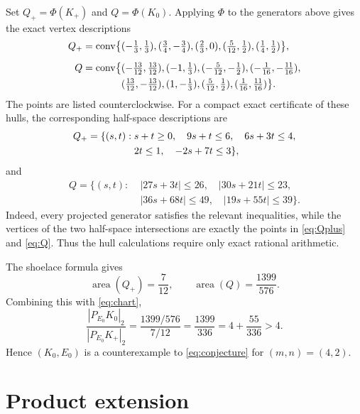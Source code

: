 \documentclass[11pt]{amsart}
\theoremstyle{remark}
\newcommand{\conv}{\operatorname{conv}}
\newcommand{\area}{\operatorname{area}}
\begin{document}
Set $Q_+=\Phi(K_+)$ and $Q=\Phi(K_0)$. Applying $\Phi$ to the generators above
gives the exact vertex descriptions
\begin{align}
Q_+=\conv\bigl\{&
(-\tfrac13,\tfrac13),
(\tfrac34,-\tfrac34),
(\tfrac23,0),
(\tfrac5{12},\tfrac12),
(\tfrac14,\tfrac12)
\bigr\},\label{eq:Qplus}\\[2mm]
Q=\conv\bigl\{&
(-\tfrac{13}{12},\tfrac{13}{12}),
(-1,\tfrac13),
(-\tfrac5{12},-\tfrac12),
(-\tfrac1{16},-\tfrac{11}{16}),\notag\\
&
(\tfrac{13}{12},-\tfrac{13}{12}),
(1,-\tfrac13),
(\tfrac5{12},\tfrac12),
(\tfrac1{16},\tfrac{11}{16})
\bigr\}.\label{eq:Q}
\end{align}
The points are listed counterclockwise. For a compact exact certificate of
these hulls, the corresponding half-space descriptions are
\begin{align}
Q_+=\{(s,t):\;&s+t\ge0,\quad 9s+t\le6,\quad 6s+3t\le4,\notag\\
&2t\le1,\quad -2s+7t\le3\},\label{eq:HQplus}
\end{align}
and
\begin{equation}\label{eq:HQ}
\begin{aligned}
Q=\{(s,t):\;&|27s+3t|\le26,\quad |30s+21t|\le23,\\
              &|36s+68t|\le49,\quad |19s+55t|\le39\}.
\end{aligned}
\end{equation}
Indeed, every projected generator satisfies the relevant inequalities, while
the vertices of the two half-space intersections are exactly the points in
\eqref{eq:Qplus} and \eqref{eq:Q}. Thus the hull calculations require only
exact rational arithmetic.

The shoelace formula gives
\[
  \area(Q_+)=\frac7{12},
  \qquad
  \area(Q)=\frac{1399}{576}.
\]
Combining this with \eqref{eq:chart},
\begin{equation}\label{eq:ratio}
  \frac{|P_{E_0}K_0|_2}{|P_{E_0}K_+|_2}
  =\frac{1399/576}{7/12}
  =\frac{1399}{336}
  =4+\frac{55}{336}>4.
\end{equation}
Hence $(K_0,E_0)$ is a counterexample to \eqref{eq:conjecture} for
$(m,n)=(4,2)$.

\section{Product extension}
\end{document}
